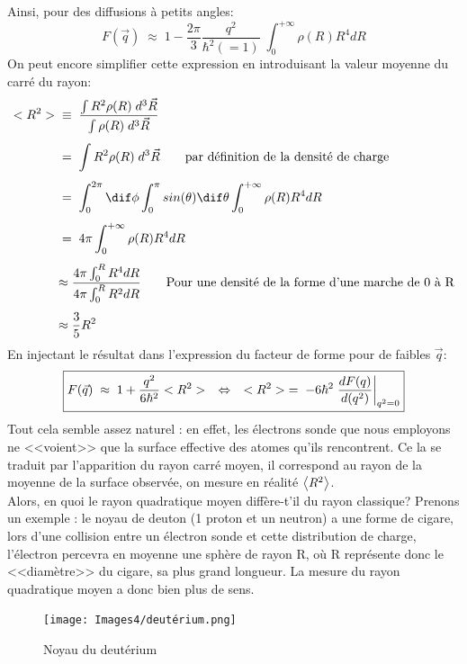 Ainsi, pour des diffusions à petits angles:
\begin{equation*}
    F(\vec{q}) \;\approx\; 1 - \dfrac{2\pi}{3}\dfrac{q^2}{\hbar^2(=1)} \;\int_0^{+\infty}\rho(R) R^4 dR
\end{equation*}
On peut encore simplifier cette expression en introduisant la valeur moyenne du carré du rayon:
\begin{align*}
    <R^2> &\;\equiv\;
    \dfrac{ \int R^2 \rho(R) \; d^3\vec{R} }{ \int \rho(R) \; d^3\vec{R} }\\[4pt]
    &\eq
    \int R^2 \rho(R) \; d^3\vec{R}
    \qquad \text{par définition de la densité de charge}\\[4pt]
    &\eq
    \int_0^{2\pi}\dif\phi \int_0^{\pi} sin(\theta) \dif\theta \int_0^{+\infty}\rho(R) R^4dR\\[4pt]
    &\eq 
    4\pi \int_0^{+\infty}\rho(R) R^4dR\\[4pt]
    &\approx \dfrac{4\pi\int_0^R R^4dR}{4\pi\int_0^R R^2dR} \qquad \text{Pour une densité de la forme d'une marche de 0 à R}\\[4pt]
    &\approx \dfrac{3}{5}R^2
\end{align*}
En injectant le résultat dans l'expression du facteur de forme pour de faibles $\vec{q}$:
\begin{equation}
    \boxed{
    F(\vec{q}) \;\approx\; 1 + \dfrac{q^2}{6\hbar^2} <R^2>
    \quad \Leftrightarrow \quad
    <R^2> \; = \; -6\hbar^2 \left. \dfrac{dF(q)}{d(q^2)}\right|_{q^2=0}
    }
    \label{deriv_fact_forme}
\end{equation}
Tout cela semble assez naturel :  en effet, les électrons sonde que nous employons ne <<voient>> que la surface effective des atomes qu'ils rencontrent. Ce la se traduit par l'apparition du rayon carré moyen, il correspond au rayon de la moyenne de la surface observée, on mesure en réalité $\expval{R^2}$.\\
Alors, en quoi le rayon quadratique moyen diffère-t'il du rayon classique? Prenons un exemple : le noyau de deuton (1 proton et un neutron) a une forme de cigare, lors d'une collision entre un électron sonde et cette distribution de charge, l'électron percevra en moyenne une sphère de rayon R, où R représente donc le <<diamètre>> du cigare, sa plus grand longueur. La mesure du rayon quadratique moyen a donc bien plus de sens.\\
\begin{figure}[H]
    \centering
    \texttt{[image: Images4/deutérium.png]}
    \caption{Noyau du deutérium}
\end{figure}

